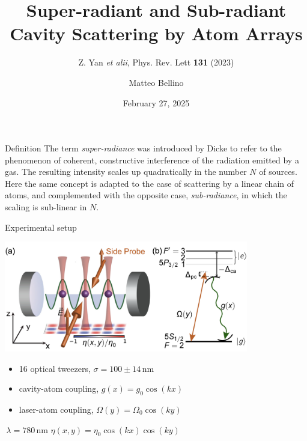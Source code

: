 \documentclass{beamer}
\author{Matteo Bellino}
\title{Super-radiant and Sub-radiant Cavity Scattering by Atom Arrays}
\subtitle{Z. Yan \textit{et alii}, Phys. Rev. Lett \textbf{131} (2023)}
\date{February 27, 2025}
\begin{document}
\frame{\maketitle}
\begin{frame}{Definition}
	The term \alert{\textit{super-radiance}} was introduced by Dicke to refer to the phenomenon of coherent, constructive interference of the radiation emitted by a gas.
	The resulting intensity scales up quadratically in the number $N$ of sources.\newline\pause
	~\newline
	Here the same concept is adapted to the case of scattering by a linear chain of atoms, and complemented with the opposite case, \alert{\textit{sub-radiance}}, in which the scaling is sub-linear in $N$.
\end{frame}

\begin{frame}{Experimental setup}
	\begin{minipage}{\textwidth}
		\centering
		\includegraphics[width=0.8\textwidth]{Figure_1.png}
		\hspace{3em}
	\end{minipage}\newline
	\vspace{2em}
	\begin{minipage}{\textwidth}
		\begin{minipage}{0.57\textwidth}
			\begin{itemize}
				\item {\small 16 optical tweezers, $\sigma = 100\pm14\,$nm\pause}
				\item {\small cavity-atom coupling, $g(x)=g_0\cos(kx)$}\pause
				\item {\small laser-atom coupling, $\Omega(y)=\Omega_0\cos(ky)$}
			\end{itemize}
		\end{minipage}
		\begin{minipage}{0.42\textwidth}
			\centering
			$\,\lambda=780\,$nm\newline
			\alert{$\eta(x,y)=\eta_0\cos(kx)\cos(ky)$}
		\end{minipage}
	\end{minipage}
\end{frame}
\end{document}
